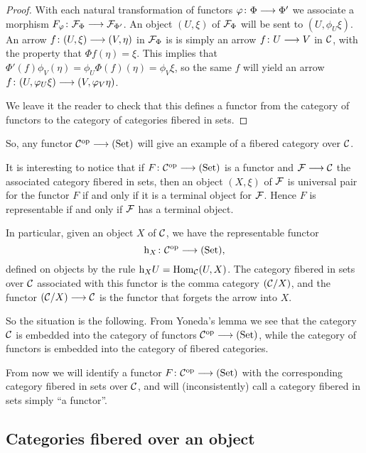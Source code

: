 \begin{3   FIBERED CATEGORIES}
\begin{3.4 Functors and cats fibered in sets}
\begin{proof}
With each natural transformation of functors $\phi\colon \Phi \arr \Phi'$ we associate a morphism $F_\phi \colon \cF_\Phi \arr \cF_{\Phi'}$. An object $(U, \xi)$ of $\mathcal{F}_\Phi$ will be sent to $(U, \phi_U \xi)$. An arrow $f \colon (U, \xi) \arr (V, \eta)$ in $\mathcal{F}_\Phi$ is is simply an arrow $f \colon U \arr V$ in $\mathcal{C}$, with the property that $\Phi f(\eta) = \xi $. This implies that $\Phi'(f) \phi_V(\eta) = \phi_U \Phi(f) (\eta) = \phi_V \xi$, so the same $f$ will yield an arrow $f \colon (U, \phi_U \xi) \arr (V, \phi_V \eta)$. 

We leave it the reader to check that this defines a functor from the category of functors to the category of categories fibered in sets.
\end{proof}

So, any functor $\cC\op  \arr \catset $ will give an example of a fibered category over $\mathcal{C}$.

\begin{remark}
It is interesting to notice that if $F \colon \cC\op \arr \catset$ is a functor and $\cF \arr \cC$ the associated category fibered in sets, then an object $(X, \xi)$ of $\mathcal{F}$ is universal pair for the functor $F$ if and only if it is a terminal object for $\mathcal{F}$. Hence $F$ is representable if and only if $\mathcal{F}$ has a terminal object.
\end{remark}

In particular, given an object $X$ of $\mathcal{C}$, we have the representable functor 
   \[
   \h_X\colon \cC\op \arr \catset,
   \]
defined on objects by the rule $\mathrm{h}_X U = \operatorname{Hom}_{\mathcal{C}}(U,X)$. The category fibered in sets over $\mathcal{C}$ associated with this functor is the comma category $(\mathcal{C}/X)$, and the functor $(\cC/X) \arr \cC$ is the functor that forgets the arrow into $X$.
 
So the situation is the following. From Yoneda's lemma we see that the category $\mathcal{C}$ is embedded into the category of functors $\cC\op \arr \catset$, while the category of functors is embedded into the category of fibered categories.

From now we will identify a functor $F \colon \cC\op \arr \catset$ with the corresponding category fibered in sets over $\mathcal{C}$, and will (inconsistently) call a category fibered in sets simply ``a functor''.


\subsection{Categories fibered over an object}
\label{subsec:fibered-over}


\end{3.4 Functors and cats fibered in sets}
\end{3   FIBERED CATEGORIES}
